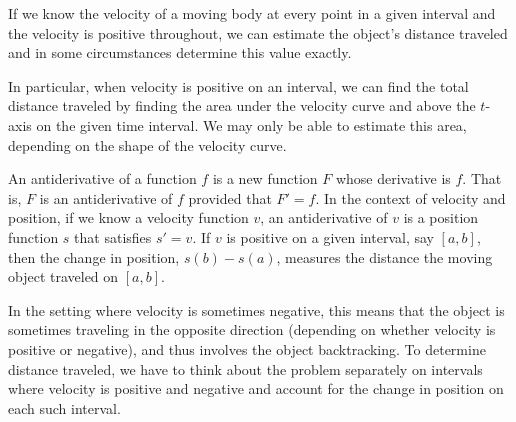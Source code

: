 \begin{summary}
\item If we know the velocity of a moving body at every point in a given interval and the velocity is positive throughout, we can estimate the object's distance traveled and in some circumstances determine this value exactly.
\item In particular, when velocity is positive on an interval, we can find the total distance traveled by finding the area under the velocity curve and above the $t$-axis on the given time interval.  We may only be able to estimate this area, depending on the shape of the velocity curve.
\item An antiderivative of a function $f$ is a new function $F$ whose derivative is $f$.  That is, $F$ is an antiderivative of $f$ provided that $F' = f$.  In the context of velocity and position, if we know a velocity function $v$, an antiderivative of $v$ is a position function $s$ that satisfies $s' = v$.  If $v$ is positive on a given interval, say $[a,b]$, then the change in position, $s(b) - s(a)$, measures the distance the moving object traveled on $[a,b]$.
\item In the setting where velocity is sometimes negative, this means that the object is sometimes traveling in the opposite direction (depending on whether velocity is positive or negative), and thus involves the object backtracking.  To determine distance traveled, we have to think about the problem separately on intervals where velocity is positive and negative and account for the change in position on each such interval.
\end{summary}

\nin \hrulefill

\newpage

